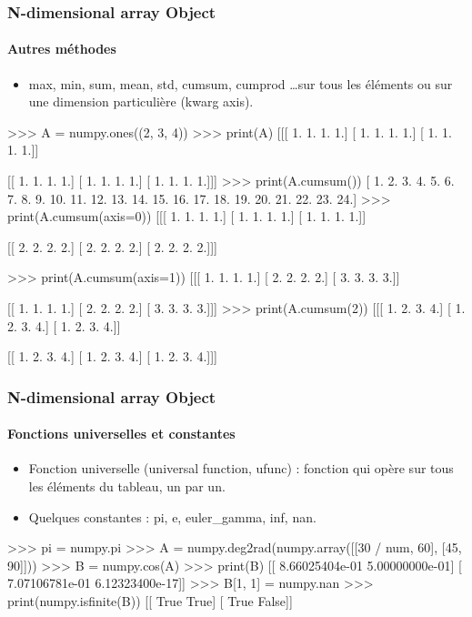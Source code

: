 \begin{frame}[fragile]
\frametitle{N-dimensional array Object}
\framesubtitle{Autres méthodes}
\begin{itemize}
 \item max, min, sum, mean, std, cumsum, cumprod \dots sur tous les éléments ou sur une dimension particulière (kwarg axis). 
\end{itemize}
\begin{minipage}{5cm}
\begin{pythonConsole}
>>> A = numpy.ones((2, 3, 4))
>>> print(A)
[[[ 1.  1.  1.  1.]
  [ 1.  1.  1.  1.]
  [ 1.  1.  1.  1.]]

 [[ 1.  1.  1.  1.]
  [ 1.  1.  1.  1.]
  [ 1.  1.  1.  1.]]]          
>>> print(A.cumsum())
[  1.   2.   3.   4.   5.   6.   7.   8.   9.  10.  11.  12.  13.  14.  15. 16.  17.  18.  19.  20.  21.  22.  23.  24.]
>>> print(A.cumsum(axis=0))
[[[ 1.  1.  1.  1.]
  [ 1.  1.  1.  1.]
  [ 1.  1.  1.  1.]]

 [[ 2.  2.  2.  2.]
  [ 2.  2.  2.  2.]
  [ 2.  2.  2.  2.]]]
\end{pythonConsole}
\end{minipage}
\begin{minipage}{5cm}
\begin{pythonConsole}
>>> print(A.cumsum(axis=1))
[[[ 1.  1.  1.  1.]
  [ 2.  2.  2.  2.]
  [ 3.  3.  3.  3.]]

 [[ 1.  1.  1.  1.]
  [ 2.  2.  2.  2.]
  [ 3.  3.  3.  3.]]]
>>> print(A.cumsum(2))
[[[ 1.  2.  3.  4.]
  [ 1.  2.  3.  4.]
  [ 1.  2.  3.  4.]]

 [[ 1.  2.  3.  4.]
  [ 1.  2.  3.  4.]
  [ 1.  2.  3.  4.]]]
\end{pythonConsole}
\end{minipage}
\end{frame}
\begin{frame}[fragile]
\frametitle{N-dimensional array Object}
\framesubtitle{Fonctions universelles et constantes}
\begin{itemize}
 \item Fonction universelle (universal function, ufunc) : fonction qui opère sur tous les éléments du tableau, un par un. 
 \item Quelques constantes : pi, e, euler\_gamma, inf, nan.
\end{itemize}
\begin{pythonConsole}

>>> pi = numpy.pi
>>> A = numpy.deg2rad(numpy.array([[30 / num, 60], [45, 90]]))
>>> B = numpy.cos(A)
>>> print(B)
[[  8.66025404e-01   5.00000000e-01]
 [  7.07106781e-01   6.12323400e-17]]
>>> B[1, 1] = numpy.nan
>>> print(numpy.isfinite(B))
[[ True  True]
 [ True False]]
\end{pythonConsole}
\end{frame}
